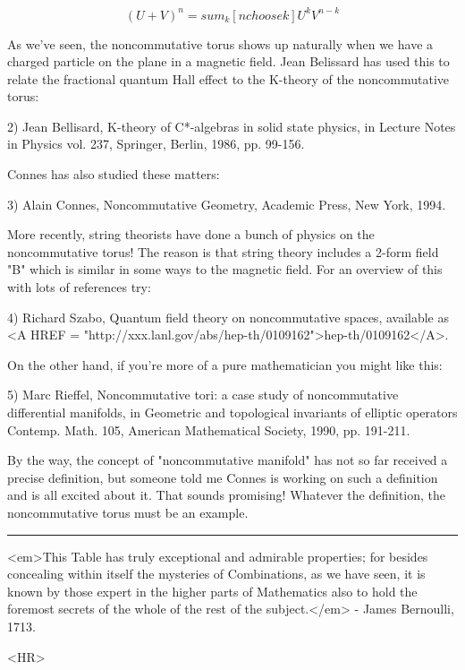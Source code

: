 $$
(U + V)^{n} = sum_{k} [n choose k] U^{k} V^{n-k}
$$
    
As we've seen, the noncommutative torus shows up naturally when we have
a charged particle on the plane in a magnetic field.  Jean Belissard has
used this to relate the fractional quantum Hall effect to the K-theory
of the noncommutative torus:

2) Jean Bellisard, K-theory of C*-algebras in solid state physics, in
Lecture Notes in Physics vol. 237, Springer, Berlin, 1986, pp. 99-156.

Connes has also studied these matters:

3) Alain Connes, Noncommutative Geometry, Academic Press, New
York, 1994.  

More recently, string theorists have done a bunch of physics on the
noncommutative torus!  The reason is that string theory includes a
2-form field "B" which is similar in some ways to the magnetic field.
For an overview of this with lots of references try:

4) Richard Szabo, Quantum field theory on noncommutative spaces,
available as <A HREF = "http://xxx.lanl.gov/abs/hep-th/0109162">hep-th/0109162</A>.  

On the other hand, if you're more of a pure mathematician you
might like this:

5) Marc Rieffel, Noncommutative tori: a case study of noncommutative
differential manifolds, in Geometric and topological invariants of
elliptic operators Contemp. Math. 105, American Mathematical Society,
1990, pp. 191-211.

By the way, the concept of "noncommutative manifold" has not so far
received a precise definition, but someone told me Connes is working on
such a definition and is all excited about it.  That sounds promising!
Whatever the definition, the noncommutative torus must be an example.

\par\noindent\rule{\textwidth}{0.4pt}
<em>This Table has truly exceptional and admirable properties;
for besides concealing within itself the mysteries of Combinations,
as we have seen, it is known by those expert in the higher parts of
Mathematics also to hold the foremost secrets of the whole of the
rest of the subject.</em> - James Bernoulli, 1713.

<HR>



